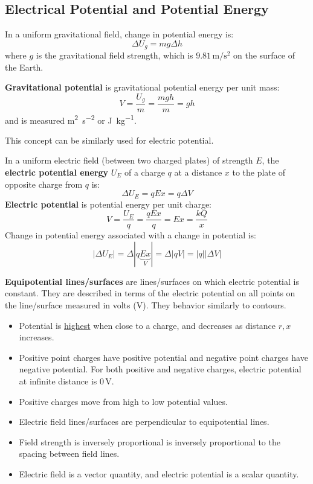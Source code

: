 \documentclass{article}
\newcommand{\definition}[1]{\begin{tcolorbox}[colback=red!5!white,colframe=red!75!black,parbox=false] #1 \end{tcolorbox}}
\newcommand{\defitheorem}[2]{\begin{tcolorbox}[title={#1},colback=violet!5!white,colframe=violet!75!black,parbox=false] #2 \end{tcolorbox}}
\begin{document}
\subsection{Electrical Potential and Potential Energy}

In a uniform gravitational field, change in potential energy is:
\begin{equation*}
    \Delta U_g=mg\Delta h
\end{equation*}
where $g$ is the gravitational field strength, which is $9.81\,\si{\meter/\second^2}$ on the surface of the Earth.

\defitheorem{Gravitational potential}{
	\textbf{Gravitational potential} is gravitational potential energy per unit mass:
	\begin{equation*}
		V=\frac{U_g}{m}=\frac{mgh}{m}=gh
	\end{equation*}
	and is measured \si{\meter^2\per\second^2} or \si{\joule\per\kilogram}.
}
This concept can be similarly used for electric potential.
\defitheorem{Electric potential and potential energy in a uniform field}{
	In a uniform electric field (between two charged plates) of strength $E$, the \textbf{electric potential energy} $U_E$ of a charge $q$ at a distance $x$ to the plate of opposite charge from $q$ is:
	\begin{equation*}
	    \Delta U_E=qEx=q\Delta V
	\end{equation*}
	\textbf{Electric potential} is potential energy per unit charge:
	\begin{equation*}
	    V=\frac{U_E}{q}=\frac{qEx}{q}=Ex=\frac{kQ}{x}
	\end{equation*}
	Change in potential energy associated with a change in potential is:
	\begin{equation*}
		\left|\Delta U_E\right|=\Delta|q\underbrace{Ex}_{V}|=\Delta \left|qV\right|=\left|q\right|\left|\Delta V\right|
	\end{equation*}
}

\definition{\textbf{Equipotential lines/surfaces} are lines/surfaces on which electric potential is constant. They are described in terms of the electric potential on all points on the line/surface measured in volts (V). They behavior similarly to contours.}

\begin{itemize}
	\item Potential is \ul{highest} when close to a charge, and decreases as distance $r,x$ increases.
	\item Positive point charges have positive potential and negative point charges have negative potential. For both positive and negative charges, electric potential at infinite distance is $0\,\si{\volt}$.
	\item Positive charges move from high to low potential values.
	\item Electric field lines/surfaces are perpendicular to equipotential lines.
	\item Field strength is inversely proportional is inversely proportional to the spacing between field lines.
	\item Electric field is a vector quantity, and electric potential is a scalar quantity.
\end{itemize}
\end{document}
